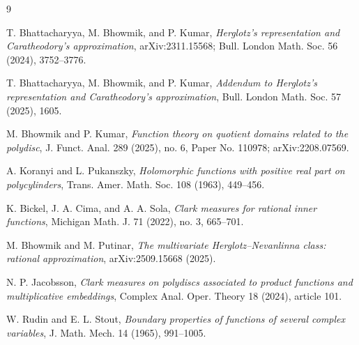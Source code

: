 \documentclass[11pt]{article}
\begin{document}
\begin{thebibliography}{9}

T. Bhattacharyya, M. Bhowmik, and P. Kumar,
\emph{Herglotz's representation and Caratheodory's approximation},
arXiv:2311.15568; Bull. London Math. Soc. 56 (2024), 3752--3776.

T. Bhattacharyya, M. Bhowmik, and P. Kumar,
\emph{Addendum to Herglotz's representation and Caratheodory's approximation},
Bull. London Math. Soc. 57 (2025), 1605.

M. Bhowmik and P. Kumar,
\emph{Function theory on quotient domains related to the polydisc},
J. Funct. Anal. 289 (2025), no. 6, Paper No. 110978; arXiv:2208.07569.

A. Koranyi and L. Pukanszky,
\emph{Holomorphic functions with positive real part on polycylinders},
Trans. Amer. Math. Soc. 108 (1963), 449--456.

K. Bickel, J. A. Cima, and A. A. Sola,
\emph{Clark measures for rational inner functions},
Michigan Math. J. 71 (2022), no. 3, 665--701.

M. Bhowmik and M. Putinar,
\emph{The multivariate Herglotz--Nevanlinna class: rational approximation},
arXiv:2509.15668 (2025).

N. P. Jacobsson,
\emph{Clark measures on polydiscs associated to product functions and
multiplicative embeddings},
Complex Anal. Oper. Theory 18 (2024), article 101.

W. Rudin and E. L. Stout,
\emph{Boundary properties of functions of several complex variables},
J. Math. Mech. 14 (1965), 991--1005.

\end{thebibliography}
\end{document}
